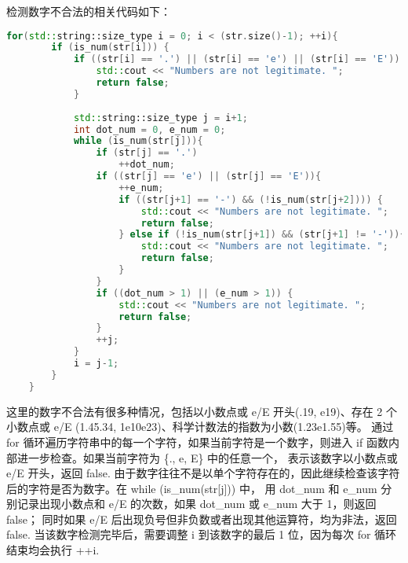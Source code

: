 \documentclass[UTF8]{ctexart}
\begin{document}
检测数字不合法的相关代码如下：
\begin{lstlisting}[language=c++, breaklines=true, keywordstyle=\color{blue!70}, commentstyle=\color{red!50!green!50!blue!50}, frame=shadowbox, rulesepcolor=\color{red!20!green!20!blue!20}]
    for(std::string::size_type i = 0; i < (str.size()-1); ++i){
        if (is_num(str[i])) {
            if ((str[i] == '.') || (str[i] == 'e') || (str[i] == 'E')) {
                std::cout << "Numbers are not legitimate. "; 
                return false; 
            }
            
            std::string::size_type j = i+1; 
            int dot_num = 0, e_num = 0; 
            while (is_num(str[j])){
                if (str[j] == '.')
                    ++dot_num;
                if ((str[j] == 'e') || (str[j] == 'E')){
                    ++e_num;
                    if ((str[j+1] == '-') && (!is_num(str[j+2]))) {
                        std::cout << "Numbers are not legitimate. "; 
                        return false; 
                    } else if (!is_num(str[j+1]) && (str[j+1] != '-')){
                        std::cout << "Numbers are not legitimate. "; 
                        return false; 
                    } 
                }
                if ((dot_num > 1) || (e_num > 1)) {
                    std::cout << "Numbers are not legitimate. "; 
                    return false; 
                }
                ++j;
            }
            i = j-1; 
        }
    }
\end{lstlisting}
这里的数字不合法有很多种情况，包括以小数点或 e/E 开头(.19, e19)、存在 2 个小数点或 e/E (1.45.34, 1e10e23)、科学计数法的指数为小数(1.23e1.55)等。
通过 for 循环遍历字符串中的每一个字符，如果当前字符是一个数字，则进入 if 函数内部进一步检查。如果当前字符为 \{., e, E\} 中的任意一个，
表示该数字以小数点或 e/E 开头，返回 false. 由于数字往往不是以单个字符存在的，因此继续检查该字符后的字符是否为数字。在 while (is\_num(str[j])) 中，
用 dot\_num 和 e\_num 分别记录出现小数点和 e/E 的次数，如果 dot\_num 或 e\_num 大于 1，则返回 false；
同时如果 e/E 后出现负号但非负数或者出现其他运算符，均为非法，返回 false. 
当该数字检测完毕后，需要调整 i 到该数字的最后 1 位，因为每次 for 循环结束均会执行 ++i. 
\end{document}
